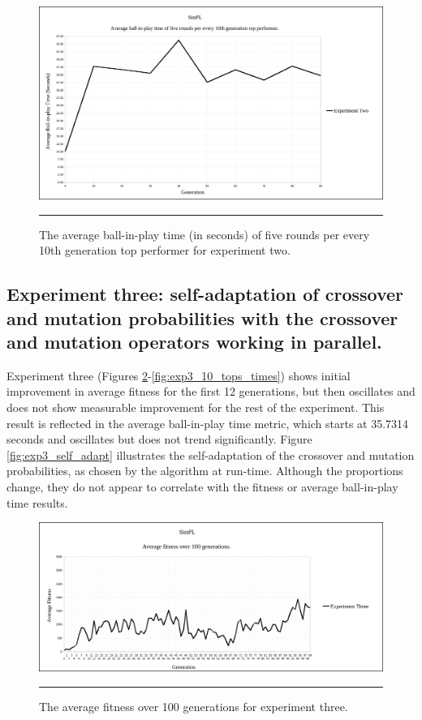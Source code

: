 \begin{figure}[ht!]  
  \centering
  \includegraphics[width=5in]{../Figures/Chapter3/exp2_10_tops_times.png}
  \rule{35em}{0.5pt}
  \caption[Experiment Two Top Performers Tournament]{The average ball-in-play time (in seconds) of five rounds per every 10th generation top performer for experiment two.}
  \label{fig:exp2_10_tops_times}
\end{figure}

\subsection[Experiment Three]{Experiment three: self-adaptation of crossover and mutation probabilities with the crossover and mutation operators working in parallel.}

Experiment three (Figures \ref{fig:exp3_avg_fit}-\ref{fig:exp3_10_tops_times}) shows initial improvement in average fitness for the first 12 generations, but then oscillates and does not show measurable improvement for the rest of the experiment. This result is reflected in the average ball-in-play time metric, which starts at 35.7314 seconds and oscillates but does not trend significantly. Figure \ref{fig:exp3_self_adapt} illustrates the self-adaptation of the crossover and mutation probabilities, as chosen by the algorithm at run-time. Although the proportions change, they do not appear to correlate with the fitness or average ball-in-play time results.

\begin{figure}[ht!]  
  \centering
  \includegraphics[width=5in]{../Figures/Chapter3/exp3_avg_fit.png}
  \rule{35em}{0.5pt}
  \caption[Experiment Three Average Fitness]{The average fitness over 100 generations for experiment three.}
  \label{fig:exp3_avg_fit}
\end{figure}


